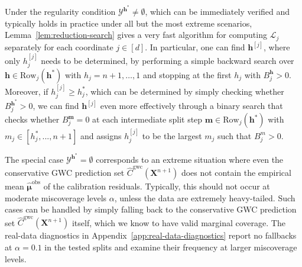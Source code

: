 Under the regularity condition $\mathcal{Y}^{\mathbf{h}^*} \neq \emptyset$, which can be immediately verified and typically holds in practice under all but the most extreme scenarios, Lemma~\ref{lem:reduction-search} gives a very fast algorithm for computing $\mathcal{L}_j$ separately for each coordinate $j \in [d]$.
In particular, one can find $\mathbf{h}^{[j]}$, where only $h^{[j]}_j$ needs to be determined, by performing a simple
backward search over $\mathbf{h} \in \mathrm{Row}_j(\mathbf{h}^*)$ with $h_j = n+1,\ldots,1$ and stopping at the first $h_j$ with $B^{\mathbf{h}}_j > 0$.
Moreover, if $h^{[j]}_j \geq h^*_j$, which can be determined by simply checking whether $B^{\mathbf{h}^*}_j > 0$,
we can find $\mathbf{h}^{[j]}$ even more effectively through a binary search that checks whether $B^{\mathbf{m}}_j=0$ at each intermediate split step $\mathbf{m} \in \mathrm{Row}_j(\mathbf{h}^*)$ with $m_j \in [h^*_j,...,n+1]$ and assigns $h^{[j]}_j$ to be the largest $m_j$ such that $B^{m}_j > 0$.

The special case $\mathcal{Y}^{\mathbf{h}^*} = \emptyset$ corresponds to an extreme situation where even the conservative GWC prediction set $\hat{C}^\mathrm{gwc}(\mathbf{X}^{n+1})$ does not contain the empirical mean $\hat{\boldsymbol\mu}^\mathrm{obs}$ of the calibration residuals. Typically, this should not occur at moderate miscoverage levels $\alpha$, unless the data are extremely heavy-tailed. Such cases can be handled by simply falling back to the conservative GWC prediction set $\hat{C}^\mathrm{gwc}(\mathbf{X}^{n+1})$ itself, which we know to have valid marginal coverage. 
The real-data diagnostics in Appendix~\ref{app:real-data-diagnostics} report no fallbacks at $\alpha=0.1$ in the tested splits and examine their frequency at larger miscoverage levels.


